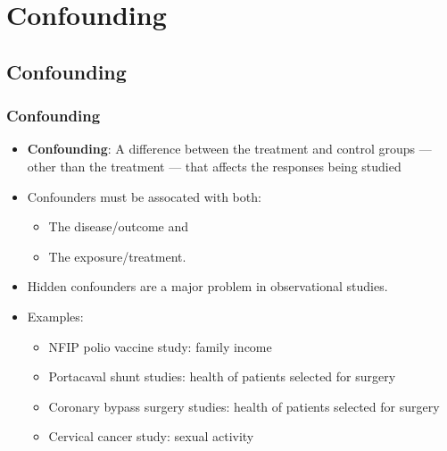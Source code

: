\documentclass[t,xcolor=pst,dvips]{beamer}
\begin{document}
\section{Confounding}
\subsection{Confounding}
\begin{frame}[t]\frametitle{Confounding}

{\small
\begin{itemize}
\item \textbf{Confounding}:  A difference between the treatment and control groups --- other than the treatment ---
   that affects the responses being studied
\item Confounders must be assocated with both:
   \begin{itemize} 
     \item The disease/outcome and 
     \item The exposure/treatment.
   \end{itemize}
\item Hidden confounders are a major problem in observational studies.
\item Examples:
   \begin{itemize}
   \item NFIP polio vaccine study:  family income
   \item Portacaval shunt studies:  health of patients selected for surgery
   \item Coronary bypass surgery studies:  health of patients selected for surgery
   \item Cervical cancer study: sexual activity
   \end{itemize}
\end{itemize}}

\label{lastpage}
\end{frame}
\end{document}
